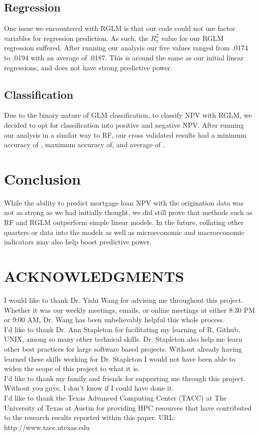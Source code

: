 \documentclass[12 pt]{uncw_thesis}
\theoremstyle{plain}
\theoremstyle{remark}
\theoremstyle{definition}
\begin{document}
\subsection{Regression}
One issue we encountered with RGLM is that our code could not use factor variables for regression prediction. As such, the \(R_a^2\) value for our RGLM regression suffered. After running our analysis our five values ranged from .0174 to .0194 with an average of .0187. This is around the same as our initial linear regressions, and does not have strong predictive power.
\subsection{Classification}
Due to the binary nature of GLM classification, to classify NPV with RGLM, we decided to opt for classification into positive and negative NPV. After running our analysis in a similar way to RF, our cross validated results had a minimum accuracy of , maximum accuracy of, and average of . 
\section{Conclusion}
While the ability to predict mortgage loan NPV with the origination data was not as strong as we had initially thought, we did still prove that methods such as RF and RGLM outperform simple linear models. In the future, collating other quarters or data into the models as well as microeconomic and macroeconomic indicators may also help boost predictive power. 

\newpage
\section*{ACKNOWLEDGMENTS}
I would like to thank Dr. Yishi Wang for advising me throughout this project. Whether it was our weekly meetings, emails, or online meetings at either 8:30 PM or 9:00 AM, Dr. Wang has been unbelievably helpful this whole process. \\
\linebreak
I'd like to thank Dr. Ann  Stapleton for facilitating my learning of R,  Github, UNIX, among so many other technical skills. Dr. Stapleton also help me learn other best practices for large software based projects. Without already having learned these skills working for Dr. Stapleton I would not have been able to widen the scope of this project to what it is.\\
\linebreak 
I'd like to thank my family and friends for supporting me through this project. Without you guys, I don't know if I could have done it.\\
\linebreak
I'd like to thank the Texas Advanced Computing Center (TACC) at The University of Texas at Austin for providing HPC resources that have contributed to the research results reported within this paper. URL: http://www.tacc.utexas.edu
%
\end{document}
